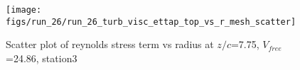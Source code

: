 \begin{figure}[H]
\centering
\texttt{[image: figs/run\_26/run\_26\_turb\_visc\_ettap\_top\_vs\_r\_mesh\_scatter]}
\caption{Scatter plot of reynolds stress term vs radius at $z/c$=7.75, $V_{free}$=24.86, station3}
\label{fig:run_26_turb_visc_ettap_top_vs_r_mesh_scatter}
\end{figure}


